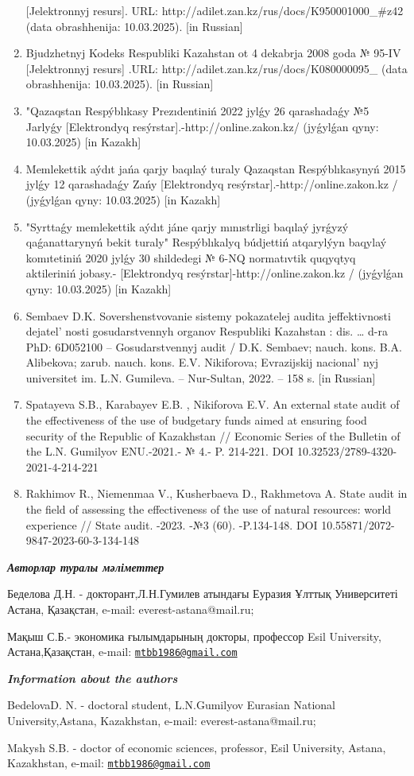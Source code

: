 \begin{enumerate}
  {[}Jelektronnyj resurs{]}. URL:
  http://adilet.zan.kz/rus/docs/K950001000\_\#z42 (data obrashhenija:
  10.03.2025). {[}in Russian{]}
\item
  Bjudzhetnyj Kodeks Respubliki Kazahstan ot 4 dekabrja 2008 goda №
  95-IV {[}Jelektronnyj resurs{]} .URL:
  http://adilet.zan.kz/rus/docs/K080000095\_ (data obrashhenija:
  10.03.2025). {[}in Russian{]}
\item
  "Qazaqstan Respýblıkasy Prezıdentiniń 2022 jylǵy 26 qarashadaǵy №5
  Jarlyǵy {[}Elektrondyq resýrstar{]}.-http://online.zakon.kz/ (jyǵylǵan
  qyny: 10.03.2025) {[}in Kazakh{]}
\item
  Memlekettik aýdıt jańa qarjy baqılaý turaly Qazaqstan Respýblıkasynyń
  2015 jylǵy 12 qarashadaǵy Zańy {[}Elektrondyq
  resýrstar{]}.-http://online.zakon.kz / (jyǵylǵan qyny: 10.03.2025)
  {[}in Kazakh{]}
\item
  "Syrttaǵy memlekettik aýdıt jáne qarjy mınıstrligi baqılaý jyrǵyzý
  qaǵanattarynyń bekit turaly" Respýblıkalyq búdjettiń atqarylýyn
  baqylaý komıtetiniń 2020 jylǵy 30 shildedegi № 6-NQ normatıvtik
  quqyqtyq aktileriniń jobasy.- {[}Elektrondyq
  resýrstar{]}-http://online.zakon.kz / (jyǵylǵan qyny: 10.03.2025)
  {[}in Kazakh{]}
\item
  Sembaev D.K. Sovershenstvovanie sistemy pokazatelej audita
  jeffektivnosti dejatel' nosti gosudarstvennyh organov
  Respubliki Kazahstan : dis. \ldots{} d-ra PhD: 6D052100 --
  Gosudarstvennyj audit / D.K. Sembaev; nauch. kons. B.A. Alibekova;
  zarub. nauch. kons. E.V. Nikiforova; Evrazijskij
  nacional' nyj universitet im. L.N. Gumileva. --
  Nur-Sultan, 2022. -- 158 s. {[}in Russian{]}
\item
  Spatayeva S.B., Karabayev E.B. , Nikiforova E.V. An external state
  audit of the effectiveness of the use of budgetary funds aimed at
  ensuring food security of the Republic of Kazakhstan // Economic
  Series of the Bulletin of the L.N. Gumilyov ENU.-2021.- № 4.- P.
  214-221. DOI 10.32523/2789-4320-2021-4-214-221
\item
  Rakhimov R., Niemenmaa V., Kusherbaeva D., Rakhmetova A. State audit
  in the field of assessing the effectiveness of the use of natural
  resources: world experience // State audit. -2023. -№3 (60).
  -P.134-148. DOI 10.55871/2072-9847-2023-60-3-134-148
\end{enumerate}

\emph{{\bfseries Авторлар туралы мәліметтер}}

Беделова Д.Н. - докторант,Л.Н.Гумилев атындағы Еуразия Ұлттық
Университеті Астана, Қазақстан, e-mail: everest-astana@mail.ru;

Мақыш С.Б.- экономика ғылымдарының докторы, профессор Esil University,
Астана,Қазақстан, e-mail:
\href{mailto:mtbb1986@gmail.com}{\nolinkurl{mtbb1986@gmail.com}}

\emph{{\bfseries Information about the authors}}

BedelovaD. N. - doctoral student, L.N.Gumilyov Eurasian National
University,Astana, Kazakhstan, e-mail: everest-astana@mail.ru;

Makysh S.B. - doctor of economic sciences, professor, Esil University,
Astana, Kazakhstan, e-mail:
\href{mailto:mtbb1986@gmail.com}{\nolinkurl{mtbb1986@gmail.com}}
